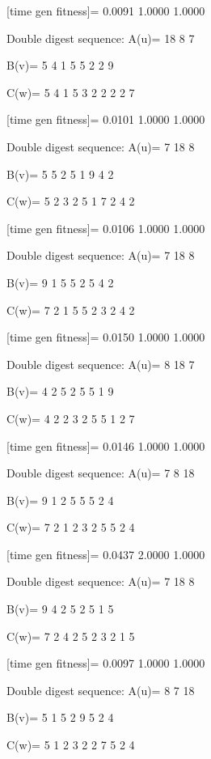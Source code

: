 [time gen fitness]=
    0.0091    1.0000    1.0000

Double digest sequence:
A(u)=
    18     8     7

B(v)=
     5     4     1     5     5     2     2     9

C(w)=
     5     4     1     5     3     2     2     2     2     7

[time gen fitness]=
    0.0101    1.0000    1.0000

Double digest sequence:
A(u)=
     7    18     8

B(v)=
     5     5     2     5     1     9     4     2

C(w)=
     5     2     3     2     5     1     7     2     4     2

[time gen fitness]=
    0.0106    1.0000    1.0000

Double digest sequence:
A(u)=
     7    18     8

B(v)=
     9     1     5     5     2     5     4     2

C(w)=
     7     2     1     5     5     2     3     2     4     2

[time gen fitness]=
    0.0150    1.0000    1.0000

Double digest sequence:
A(u)=
     8    18     7

B(v)=
     4     2     5     2     5     5     1     9

C(w)=
     4     2     2     3     2     5     5     1     2     7

[time gen fitness]=
    0.0146    1.0000    1.0000

Double digest sequence:
A(u)=
     7     8    18

B(v)=
     9     1     2     5     5     5     2     4

C(w)=
     7     2     1     2     3     2     5     5     2     4

[time gen fitness]=
    0.0437    2.0000    1.0000

Double digest sequence:
A(u)=
     7    18     8

B(v)=
     9     4     2     5     2     5     1     5

C(w)=
     7     2     4     2     5     2     3     2     1     5

[time gen fitness]=
    0.0097    1.0000    1.0000

Double digest sequence:
A(u)=
     8     7    18

B(v)=
     5     1     5     2     9     5     2     4

C(w)=
     5     1     2     3     2     2     7     5     2     4


